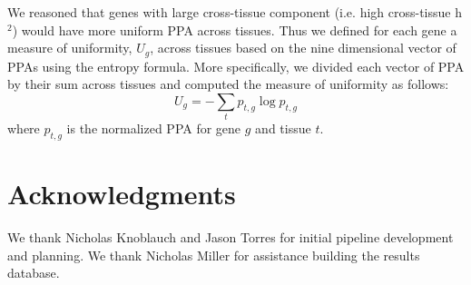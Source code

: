 \documentclass[10pt,letterpaper]{article}
\begin{document}
We reasoned that genes with large cross-tissue component (i.e. high cross-tissue h$^2$) would have more uniform PPA across tissues. Thus we defined for each gene a measure of uniformity, $U_g$, across tissues based on the nine dimensional vector of PPAs using the entropy formula. More specifically, we divided each vector of PPA by their sum across tissues and computed the measure of uniformity as follows:
\[ U_g = -\sum_{t}p_{t,g} \log p_{t,g} \]
%
where \(p_{t,g}\) is the normalized PPA for gene $g$ and tissue $t$.




\section*{Acknowledgments}
We thank Nicholas Knoblauch and Jason Torres for initial pipeline
development and planning. We thank Nicholas Miller for assistance building
the results database.

%
\end{document}
